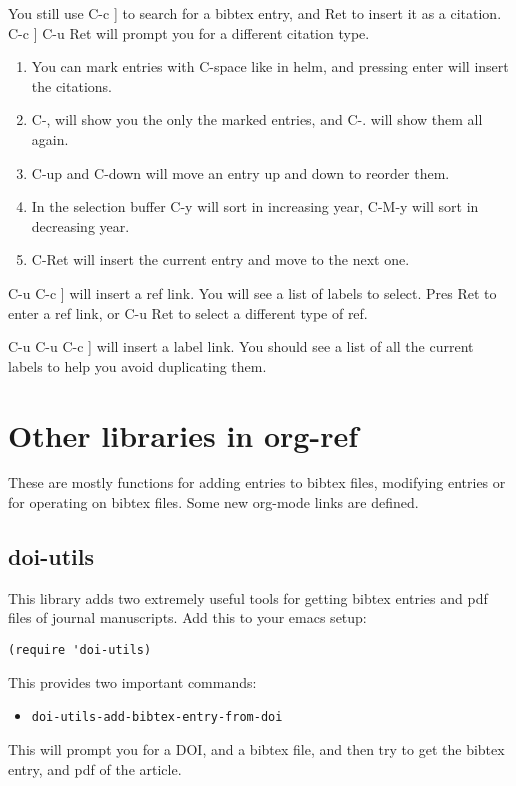 \documentclass[11pt]{article}
\begin{document}
You still use C-c ] to search for a bibtex entry, and Ret to insert it as a citation.  C-c ] C-u Ret will prompt you for a different citation type.

\begin{enumerate}
\item You can mark entries with C-space like in helm, and pressing enter will insert the citations.

\item C-, will show you the only the marked entries, and C-. will show them all again.

\item C-up and C-down will move an entry up and down to reorder them.

\item In the selection buffer C-y will sort in increasing year, C-M-y will sort in decreasing year.

\item C-Ret will insert the current entry  and move to the next one.
\end{enumerate}

C-u C-c ] will insert a ref link. You will see a list of labels to select. Pres Ret to enter a ref link, or C-u Ret to select a different type of ref.

C-u C-u C-c ] will insert a label link. You should see a list of all the current labels to help you avoid duplicating them.

\section{Other libraries in org-ref}
\label{sec:org7e1eabf}

These are mostly functions for adding entries to bibtex files, modifying entries or for operating on bibtex files. Some new org-mode links are defined.

\subsection{doi-utils}
\label{sec:orgb4ca845}

This library adds two extremely useful tools for getting bibtex entries and pdf files of journal manuscripts. Add this to your emacs setup:
\begin{verbatim}
(require 'doi-utils)
\end{verbatim}

This provides two important commands:

\begin{itemize}
\item \texttt{doi-utils-add-bibtex-entry-from-doi}
\end{itemize}
This will prompt you for a DOI, and a bibtex file, and then try to get the bibtex entry, and pdf of the article.
\end{document}
